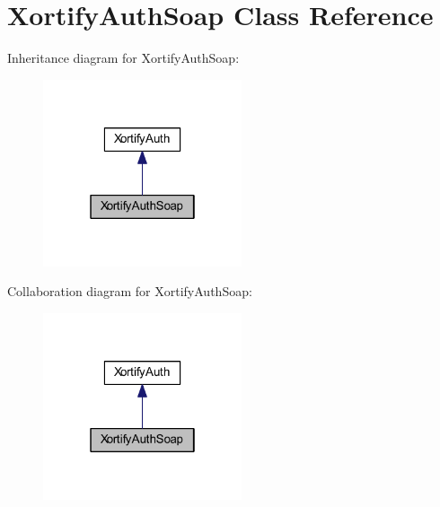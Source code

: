 \hypertarget{class_xortify_auth_soap}{\section{Xortify\-Auth\-Soap Class Reference}
\label{class_xortify_auth_soap}
}


Inheritance diagram for Xortify\-Auth\-Soap\-:
\nopagebreak
\begin{figure}[H]
\begin{center}
\leavevmode
\includegraphics[width=166pt]{class_xortify_auth_soap__inherit__graph}
\end{center}
\end{figure}


Collaboration diagram for Xortify\-Auth\-Soap\-:
\nopagebreak
\begin{figure}[H]
\begin{center}
\leavevmode
\includegraphics[width=166pt]{class_xortify_auth_soap__coll__graph}
\end{center}
\end{figure}
